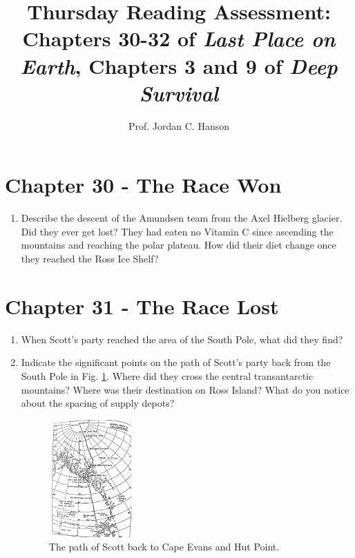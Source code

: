 \documentclass{article}
\begin{document}
\title{Thursday Reading Assessment: Chapters 30-32 of \textit{Last Place on Earth}, Chapters 3 and 9 of \textit{Deep Survival}}
\author{Prof. Jordan C. Hanson}

\maketitle

\section{Chapter 30 - The Race Won}

\begin{enumerate}
\item Describe the descent of the Amundsen team from the Axel Hielberg glacier.  Did they ever get lost?  They had eaten no Vitamin C since ascending the mountains and reaching the polar plateau.  How did their diet change once they reached the Ross Ice Shelf? \\ \vspace{2cm}
\end{enumerate}

\section{Chapter 31 - The Race Lost}

\begin{enumerate}
\item When Scott's party reached the area of the South Pole, what did they find? \\ \vspace{1cm}
\item Indicate the significant points on the path of Scott's party back from the South Pole in Fig. \ref{fig:scott}.  Where did they cross the central transantarctic mountains?  Where was their destination on Ross Island?  What do you notice about the spacing of supply depots?
\begin{figure}[hb]
\centering
\includegraphics[width=0.3\textwidth]{scott.pdf}
\caption{\label{fig:scott} The path of Scott back to Cape Evans and Hut Point.}
\end{figure}
\end{enumerate}
\end{document}
